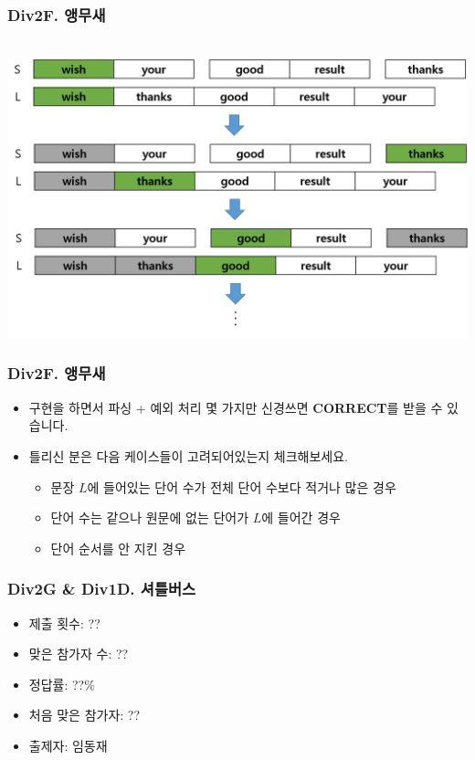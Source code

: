 \documentclass[xetex]{beamer}
\begin{document}
\begin{frame}
  \frametitle{Div2F. 앵무새}
  \begin{center}
    \includegraphics[width=1\textwidth]{parrot-sol.png}
  \end{center}
\end{frame}

\begin{frame}
  \frametitle{Div2F. 앵무새}
  \begin{itemize}
    \item 구현을 하면서 파싱 + 예외 처리 몇 가지만 신경쓰면 \textbf{CORRECT}를 받을 수 있습니다.
    \item 틀리신 분은 다음 케이스들이 고려되어있는지 체크해보세요.
    \begin{itemize}
      \item 문장 $L$에 들어있는 단어 수가 전체 단어 수보다 적거나 많은 경우
      \item 단어 수는 같으나 원문에 없는 단어가 $L$에 들어간 경우
      \item 단어 순서를 안 지킨 경우
    \end{itemize}
  \end{itemize}
\end{frame}

\begin{frame}
  \frametitle{Div2G \& Div1D. 셔틀버스}
  \begin{itemize}
    \item 제출 횟수: ??
    \item 맞은 참가자 수: ??
    \item 정답률: ??\%
    \item 처음 맞은 참가자: ??
    \item 출제자: 임동재
  \end{itemize}
\end{frame}
\end{document}
